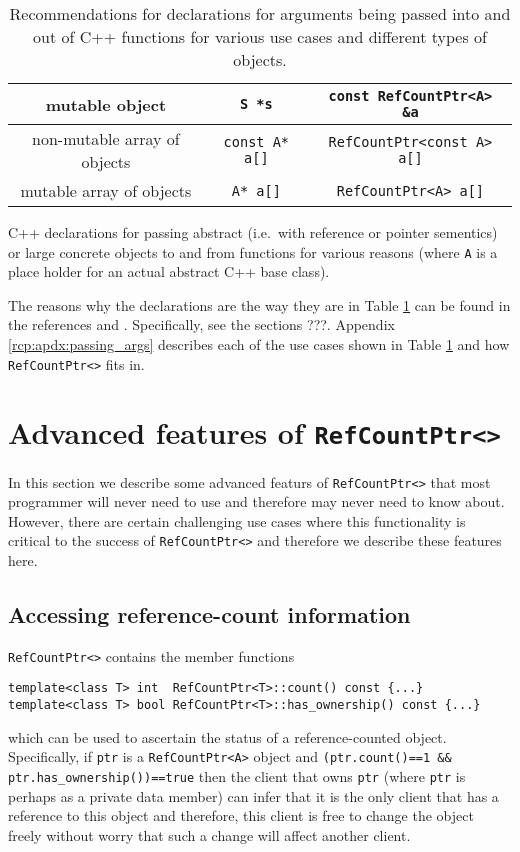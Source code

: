 \begin{table}
\begin{minipage}{{}\textwidth}
\begin{tabular}{|c|c|c|}
\hline
mutable object
& {}\texttt{S *s}
& {}\texttt{const RefCountPtr<A> \&a} \\
\hline
non-mutable array of objects
& {}\texttt{const A* a[]}
& {}\texttt{RefCountPtr<const A> a[]} \\
\hline
mutable array of objects
& {}\texttt{A* a[]}
& {}\texttt{RefCountPtr<A> a[]} \\
\hline
\end{tabular}
\begin{center}
C++ declarations for passing abstract (i.e.~with reference or pointer
sementics) or large concrete objects to and from functions for various
reasons (where {}\texttt{A} is a place holder for an actual abstract C++
base class).
\end{center}
\end{minipage}
%
\caption{\label{rcp:tbl:fnc-decl}
Recommendations for declarations for arguments being passed into and
out of C++ functions for various use cases and different types of
objects.}
%
\end{table}

The reasons why the declarations are the way they are in Table
{}\ref{rcp:tbl:fnc-decl} can be found in the references
{}\cite{ref:stroustrup_2000} and {}\cite{ref:meyers_1994}.
Specifically, see the sections ???.  Appendix
{}\ref{rcp:apdx:passing_args} describes each of the use cases shown in
Table {}{}\ref{rcp:tbl:fnc-decl} and how {}\texttt{RefCountPtr<>} fits
in.

%
\section{Advanced features of {}\texttt{RefCountPtr<>}}
%

In this section we describe some advanced featurs of
{}\texttt{RefCountPtr<>} that most programmer will never need to use and
therefore may never need to know about.  However, there are certain
challenging use cases where this functionality is critical to the
success of {}\texttt{RefCountPtr<>} and therefore we describe these
features here.

%
\subsection{Accessing reference-count information}
%

{}\texttt{RefCountPtr<>} contains the member functions
%
{\scriptsize\begin{verbatim}
template<class T> int  RefCountPtr<T>::count() const {...}
template<class T> bool RefCountPtr<T>::has_ownership() const {...}
\end{verbatim}}
%
\noindent{}
which can be used to ascertain the status of a
reference-counted object.  Specifically, if {}\texttt{ptr} is a
{}\texttt{RefCountPtr<A>} object and {}\texttt{(ptr.count()==1 \&\&
ptr.has\_ownership())==true} then the client that owns {}\texttt{ptr}
(where {}\texttt{ptr} is perhaps as a private data member) can infer
that it is the only client that has a reference to this object and
therefore, this client is free to change the object freely without
worry that such a change will affect another client.

